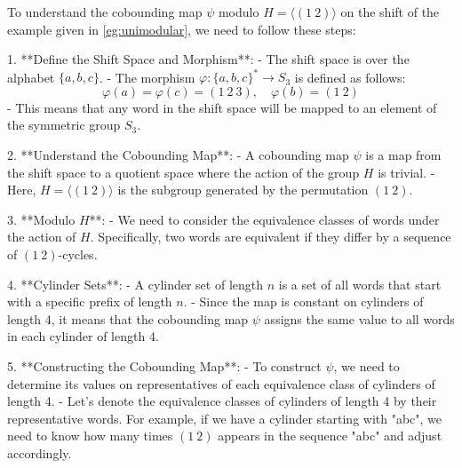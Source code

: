 To understand the cobounding map \( \psi \) modulo \( H = \langle (1 \: 2) \rangle \) on the shift of the example given in \cref{eg:unimodular}, we need to follow these steps:

1. **Define the Shift Space and Morphism**:
   - The shift space is over the alphabet \( \{a, b, c\} \).
   - The morphism \( \varphi: \{a, b, c\}^* \to S_3 \) is defined as follows:
     \[
     \varphi(a) = \varphi(c) = (1 \: 2 \: 3), \quad \varphi(b) = (1 \: 2)
     \]
   - This means that any word in the shift space will be mapped to an element of the symmetric group \( S_3 \).

2. **Understand the Cobounding Map**:
   - A cobounding map \( \psi \) is a map from the shift space to a quotient space where the action of the group \( H \) is trivial.
   - Here, \( H = \langle (1 \: 2) \rangle \) is the subgroup generated by the permutation \( (1 \: 2) \).

3. **Modulo \( H \)**:
   - We need to consider the equivalence classes of words under the action of \( H \). Specifically, two words are equivalent if they differ by a sequence of \( (1 \: 2) \)-cycles.

4. **Cylinder Sets**:
   - A cylinder set of length \( n \) is a set of all words that start with a specific prefix of length \( n \).
   - Since the map is constant on cylinders of length 4, it means that the cobounding map \( \psi \) assigns the same value to all words in each cylinder of length 4.

5. **Constructing the Cobounding Map**:
   - To construct \( \psi \), we need to determine its values on representatives of each equivalence class of cylinders of length 4.
   - Let's denote the equivalence classes of cylinders of length 4 by their representative words. For example, if we have a cylinder starting with "abc", we need to know how many times \( (1 \: 2) \) appears in the sequence "abc" and adjust accordingly.

